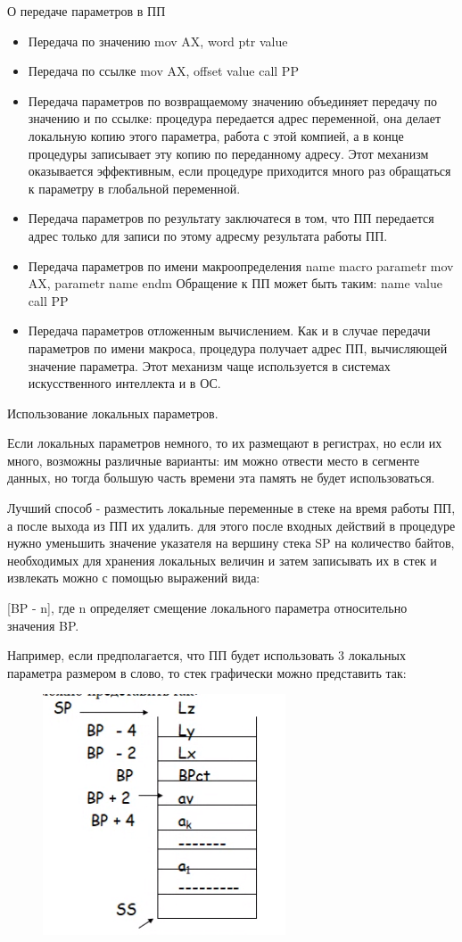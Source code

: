 О передаче параметров в ПП

\begin{itemize}
\item Передача по значению
mov AX, word ptr value
\item Передача по ссылке
mov AX, offset value
call PP
\item Передача параметров по возвращаемому значению объединяет передачу по значению и по ссылке: процедура передается адрес переменной, она делает локальную копию этого параметра, работа с этой компией, а в конце процедуры записывает эту копию по переданному адресу. Этот механизм оказывается эффективным, если процедуре приходится много раз обращаться к параметру в глобальной переменной.
\item Передача параметров по результату заключатеся в том, что ПП передается адрес только для записи по этому адресму результата работы ПП.
\item Передача параметров по имени макроопределения
name macro parametr
mov AX, parametr
name endm
Обращение к ПП может быть таким:
name value
call PP
\item Передача параметров отложенным вычислением. Как и в случае передачи параметров по имени макроса, процедура получает адрес ПП, вычисляющей значение параметра. Этот механизм чаще используется в системах искусственного интеллекта и в ОС.
\end{itemize}

Использование локальных параметров.

Если локальных параметров немного, то их размещают в регистрах, но если их много, возможны различные варианты: им можно отвести место в сегменте данных, но тогда большую часть времени эта память не будет использоваться.

Лучший способ - разместить локальные переменные в стеке на время работы ПП, а после выхода из ПП их удалить. для этого после входных действий в процедуре нужно уменьшить значение указателя на вершину стека SP на количество байтов, необходимых для хранения локальных величин и затем записывать их в стек и извлекать можно с помощью выражений вида:

[BP - n], где n определяет смещение локального параметра относительно значения BP.

Например, если предполагается, что ПП будет использовать 3 локальных параметра размером в слово, то стек графически можно представить так:

\begin{figure}[H]
\includegraphics{procstack3.png}
\end{figure}

